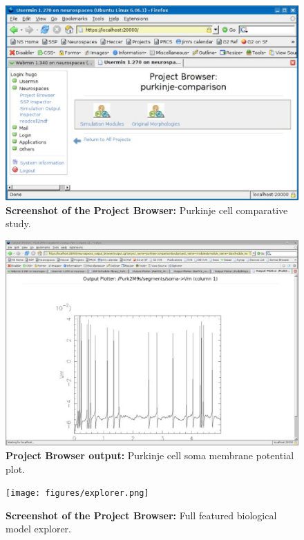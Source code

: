 \documentclass[12pt]{article}
\begin{document}
\begin{figure}[h]
  \centering
 \includegraphics[scale=0.6]{figures/screenshot-3.eps}
 \caption{{\bf Screenshot of the Project Browser:} Purkinje cell comparative study.}
  \label{fig:pb-3}
\end{figure}

\begin{figure}[h]
  \centering
 \includegraphics[scale=0.6]{figures/screenshot-4.eps}
 \caption{{\bf Project Browser output:} Purkinje cell soma membrane potential plot.}
  \label{fig:pb-4}
\end{figure}

\begin{figure}[h]
  \centering
 \texttt{[image: figures/explorer.png]}
  \caption{{\bf Screenshot of the Project Browser:} Full featured biological model explorer.}
  \label{fig:pb-5}
\end{figure}
\end{document}
